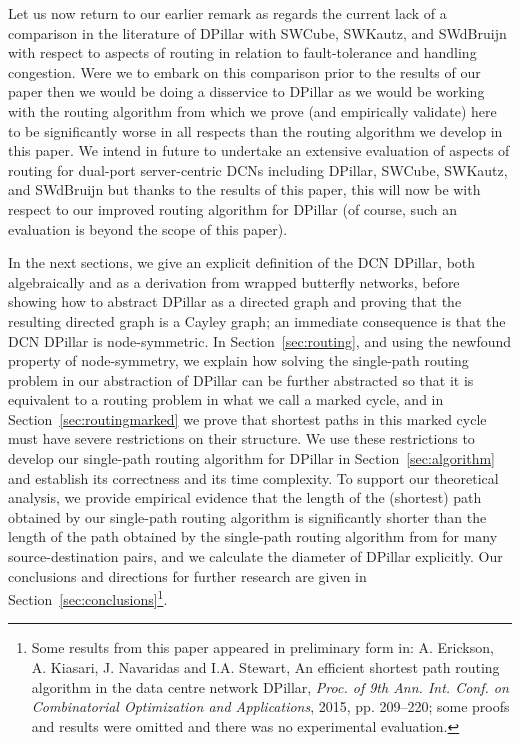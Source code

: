 \documentclass{article}
\begin{document}
Let us now return to our earlier remark as regards the current lack of a comparison in the literature of DPillar with SWCube, SWKautz, and SWdBruijn with respect to aspects of routing in relation to fault-tolerance and handling congestion. Were we to embark on this comparison prior to the results of our paper then we would be doing a disservice to DPillar as we would be working with the routing algorithm from \cite{LYY12} which we prove (and empirically validate) here to be significantly worse in all respects than the routing algorithm we develop in this paper. We intend in future to undertake an extensive evaluation of aspects of routing for dual-port server-centric DCNs including DPillar, SWCube, SWKautz, and SWdBruijn but thanks to the results of this paper, this will now be with respect to our improved routing algorithm for DPillar (of course, such an evaluation is beyond the scope of this paper).



In the next sections, we give an explicit definition of the DCN DPillar, both
algebraically and as a derivation from wrapped butterfly networks, before
showing how to abstract DPillar as a directed graph and proving that the
resulting directed graph is a Cayley graph; an immediate consequence is that the
DCN DPillar is node-symmetric. In Section~\ref{sec:routing}, and using the
newfound property of node-symmetry, we explain how solving the single-path
routing problem in our abstraction of DPillar can be further abstracted so that
it is equivalent to a routing problem in what we call a marked cycle, and in
Section~\ref{sec:routingmarked} we prove that shortest paths in this marked
cycle must have severe restrictions on their structure. We use these
restrictions to develop our single-path routing algorithm for DPillar in
Section~\ref{sec:algorithm} and establish its correctness and its time
complexity. To support our theoretical analysis, we provide empirical evidence
that the length of the (shortest) path obtained by our single-path routing
algorithm is significantly shorter than the length of the path obtained by the
single-path routing algorithm from \cite{LYY12} for many source-destination
pairs, and we calculate the diameter of DPillar explicitly. Our conclusions and
directions for further research are given in
Section~\ref{sec:conclusions}\footnote{Some results from this paper appeared in
  preliminary form in: A. Erickson, A. Kiasari, J. Navaridas and I.A. Stewart,
  An efficient shortest path routing algorithm in the data centre network
  DPillar, \emph{Proc. of 9th Ann. Int. Conf. on Combinatorial Optimization and
    Applications}, 2015, pp. 209--220; some proofs and results were omitted and
  there was no experimental evaluation.}.
\end{document}
